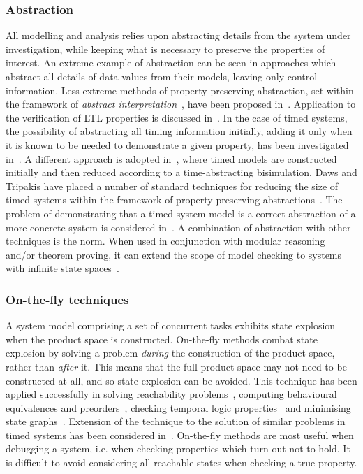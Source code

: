 {\subsubsection{Abstraction} 
All modelling and analysis relies upon abstracting details from the
system under investigation, while keeping what is necessary to
preserve the properties of interest. An extreme example of abstraction
can be seen in approaches which abstract all details of data values
from their models, leaving only control information. Less extreme
methods of property-preserving abstraction, set within the framework
of \emph{abstract interpretation}~\cite{cc:77}, have been proposed
in~\cite{cgl:94,lgs:95,sbl:99}. Application to the verification of LTL
properties is discussed in~\cite{kp:98}. In the case of timed systems,
the possibility of abstracting all timing information initially,
adding it only when it is known to be needed to demonstrate a given
property, has been investigated in~\cite{aik:95}. A different approach
is adopted in~\cite{ty:96}, where timed models are constructed
initially and then reduced according to a time-abstracting
bisimulation. Daws and Tripakis have placed a number of standard
techniques for reducing the size of timed systems within the framework
of property-preserving abstractions~\cite{dt:98}. The problem of
demonstrating that a timed system model is a correct abstraction of a
more concrete system is considered in~\cite{tak:96}. A combination of
abstraction with other techniques is the norm. When used in conjunction
with modular reasoning and/or theorem proving, it can extend the scope
of model checking to systems with infinite state
spaces~\cite{aab:99,df:95,rss:95,ss:99}.

\subsubsection{On-the-fly techniques}
A system model comprising a set of concurrent tasks exhibits state
explosion when the product space is constructed. On-the-fly methods
combat state explosion by solving a problem \emph{during} the
construction of the product space, rather than \emph{after} it. This
means that the full product space may not need to be constructed at
all, and so state explosion can be avoided. This technique has been
applied successfully in solving reachability problems~\cite{jj:89},
computing behavioural equivalences and preorders~\cite{fm:91},
checking temporal logic properties~\cite{gpv:95,vw:86} and minimising
state graphs~\cite{bfh:92}. Extension of the technique to the solution
of similar problems in timed systems has been considered
in~\cite{bty:97,hkv:96,ty:96}. On-the-fly methods are most useful when
debugging a system, i.e.  when checking properties which turn out not
to hold. It is difficult to avoid considering all reachable states
when checking a true property.

}
